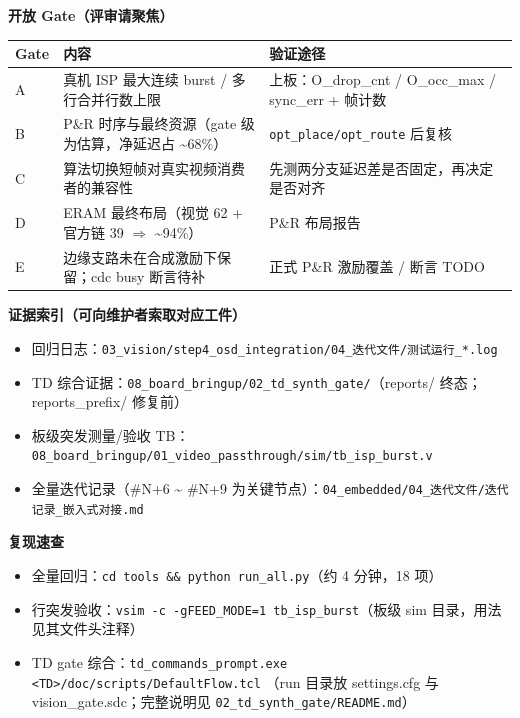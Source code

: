 \documentclass[10pt]{ctexart}
\newcommand{\code}[1]{\texttt{#1}}
\begin{document}
\textbf{开放 Gate（评审请聚焦）}
\begin{center}
{\small
\begin{tabular}{p{1.1cm}p{7.4cm}p{8.2cm}}
\toprule
\rowcolor{rowtint}\textbf{Gate} & \textbf{内容} & \textbf{验证途径} \\
\midrule
A & 真机 ISP 最大连续 burst / 多行合并行数上限 & 上板：O\_drop\_cnt / O\_occ\_max / sync\_err + 帧计数 \\
B & P\&R 时序与最终资源（gate 级为估算，净延迟占 \~{}68\%）& \code{opt\_place/opt\_route} 后复核 \\
C & 算法切换短帧对真实视频消费者的兼容性 & 先测两分支延迟差是否固定，再决定是否对齐 \\
D & ERAM 最终布局（视觉 62 + 官方链 39 $\Rightarrow$ \~{}94\%）& P\&R 布局报告 \\
E & 边缘支路未在合成激励下保留；cdc busy 断言待补 & 正式 P\&R 激励覆盖 / 断言 TODO \\
\bottomrule
\end{tabular}}
\end{center}

\textbf{证据索引（可向维护者索取对应工件）}
\begin{itemize}
  \item 回归日志：\code{03\_vision/step4\_osd\_integration/04\_迭代文件/测试运行\_*.log}
  \item TD 综合证据：\code{08\_board\_bringup/02\_td\_synth\_gate/}（reports/ 终态；reports\_prefix/ 修复前）
  \item 板级突发测量/验收 TB：\code{08\_board\_bringup/01\_video\_passthrough/sim/tb\_isp\_burst.v}
  \item 全量迭代记录（\#N+6 \~{} \#N+9 为关键节点）：\code{04\_embedded/04\_迭代文件/迭代记录\_嵌入式对接.md}
\end{itemize}

\textbf{复现速查}
\begin{itemize}
  \item 全量回归：\code{cd tools \&\& python run\_all.py}（约 4 分钟，18 项）
  \item 行突发验收：\code{vsim -c -gFEED\_MODE=1 tb\_isp\_burst}（板级 sim 目录，用法见其文件头注释）
  \item TD gate 综合：\code{td\_commands\_prompt.exe <TD>/doc/scripts/DefaultFlow.tcl}
        （run 目录放 settings.cfg 与 vision\_gate.sdc；完整说明见 \code{02\_td\_synth\_gate/README.md}）
\end{itemize}
\end{document}
